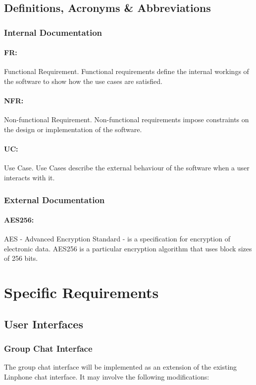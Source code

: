 \documentclass[11pt]{article}
\begin{document}
\subsection{Definitions, Acronyms \& Abbreviations}
\subsubsection{Internal Documentation}
\paragraph{FR:} Functional Requirement. Functional requirements define the internal workings of the software to show how the use cases are satisfied.
\paragraph{NFR:} Non-functional Requirement. Non-functional requirements impose constraints on the design or implementation of the software.
\paragraph{UC:} Use Case. Use Cases describe the external behaviour of the software when a user interacts with it.
\subsubsection{External Documentation}
\paragraph{AES256:} AES - Advanced Encryption Standard - is a specification for encryption of electronic data. AES256 is a particular encryption algorithm that uses block sizes of 256 bits.

\section{Specific Requirements}
\subsection{User Interfaces}
\subsubsection{Group Chat Interface} The group chat interface will be implemented as an extension of the existing Linphone chat interface. It may involve the following modifications:
\end{document}
